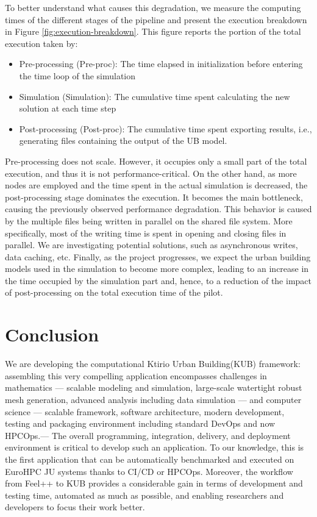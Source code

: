 \documentclass[runningheads]{llncs}
\begin{document}
To better understand what causes this degradation, we measure the computing times of the different stages of the pipeline and present the execution breakdown in Figure \ref{fig:execution-breakdown}. This figure reports the portion of the total execution taken by:
\begin{itemize}
\item Pre-processing (Pre-proc): The time elapsed in initialization before entering the time loop of the simulation
\item Simulation (Simulation): The cumulative time spent calculating the new solution at each time step
\item Post-processing (Post-proc): The cumulative time spent exporting results, i.e., generating files containing the output of the UB model.
\end{itemize}

Pre-processing does not scale. However, it occupies only a small part of the total execution, and thus it is not performance-critical. On the other hand, as more nodes are employed and the time spent in the actual simulation is decreased, the post-processing stage dominates the execution. It becomes the main bottleneck, causing the previously observed performance degradation.
This behavior is caused by the multiple files being written in parallel on the shared file system. More specifically, most of the writing time is spent in opening and closing files in parallel. We are investigating potential solutions, such as asynchronous writes, data caching, etc. Finally, as the project progresses, we expect the urban building models used in the simulation to become more complex, leading to an increase in the time occupied by the simulation part and, hence, to a reduction of the impact of post-processing on the total execution time of the pilot.


\section{Conclusion}

We are developing the computational Ktirio Urban Building(KUB) framework: assembling this very compelling application encompasses challenges in mathematics --- scalable modeling and simulation, large-scale watertight robust mesh generation, advanced analysis including data simulation --- and computer science --- scalable framework, software architecture, modern development, testing and packaging environment including standard DevOps and now HPCOps.---
The overall programming, integration, delivery, and deployment environment is critical to develop such an application. To our knowledge, this is the first application that can be automatically benchmarked and executed on EuroHPC JU systems thanks to CI/CD or HPCOps. Moreover, the workflow from Feel++ to KUB provides a considerable gain in terms of development and testing time, automated as much as possible, and enabling researchers and developers to focus their work better.
\end{document}
